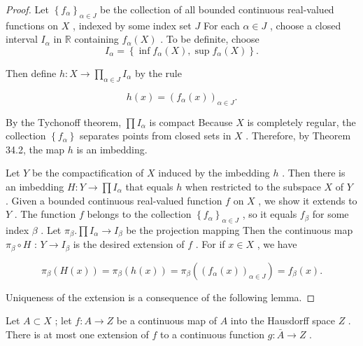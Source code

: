 \begin{proof}Let \({\left\{  {f}_{\alpha }\right\}  }_{\alpha  \in  J}\) be the collection of all bounded continuous real-valued functions on \(X\) , indexed by some index set \(J\) For each \(\alpha  \in  J\) , choose a closed interval \({I}_{\alpha }\) in \(\mathbb{R}\) containing \({f}_{\alpha }\left( X\right)\) . To be definite, choose
\[
{I}_{\alpha } = \left\{  {\inf {f}_{\alpha }\left( X\right) ,\sup {f}_{\alpha }\left( X\right) }\right\}  .
\]

Then define \(h : X \rightarrow  \mathop{\prod }\limits_{{\alpha  \in  J}}{I}_{\alpha }\) by the rule

\[
h\left( x\right)  = {\left( {f}_{\alpha }\left( x\right) \right) }_{\alpha  \in  J}.
\]

By the Tychonoff theorem, \(\prod {I}_{\alpha }\) is compact Because \(X\) is completely regular, the collection \(\left\{  {f}_{\alpha }\right\}\) separates points from closed sets in \(X\) . Therefore, by Theorem 34.2, the map \(h\) is an imbedding.

Let \(Y\) be the compactification of \(X\) induced by the imbedding \(h\) . Then there is an imbedding \(H : Y \rightarrow  \prod {I}_{\alpha }\) that equals \(h\) when restricted to the subspace \(X\) of \(Y\) . Given a bounded continuous real-valued function \(f\) on \(X\) , we show it extends to \(Y\) . The function \(f\) belongs to the collection \({\left\{  {f}_{\alpha }\right\}  }_{\alpha  \in  J}\) , so it equals \({f}_{\beta }\) for some index \(\beta\) . Let \({\pi }_{\beta }.\prod {I}_{\alpha } \rightarrow  {I}_{\beta }\) be the projection mapping Then the continuous map \({\pi }_{\beta } \circ  H\) : \(Y \rightarrow  {I}_{\beta }\) is the desired extension of \(f\) . For if \(x \in  X\) , we have

\[
{\pi }_{\beta }\left( {H\left( x\right) }\right)  = {\pi }_{\beta }\left( {h\left( x\right) }\right)  = {\pi }_{\beta }\left( {\left( {f}_{\alpha }\left( x\right) \right) }_{\alpha  \in  J}\right)  = {f}_{\beta }\left( x\right) .
\]

Uniqueness of the extension is a consequence of the following lemma.
\end{proof}
\begin{lemma} Let \(A \subset  X\) ; let \(f : A \rightarrow  Z\) be a continuous map of \(A\) into the Hausdorff space \(Z\) . There is at most one extension of \(f\) to a continuous function \(g : \bar{A} \rightarrow  Z\) .
\end{lemma}

